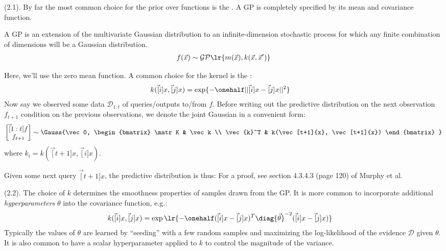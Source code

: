 \documentclass[11pt]{article}
\begin{document}
 (2.1). By far the most common choice for the prior over functions is the . A GP is completely specified by its mean and covariance function.
\begin{myquote}
	A GP is an extension of the multivariate Gaussian distribution to an infinite-dimension stochastic process for which any finite combination of dimensions will be a Gaussian distribution.
	\begin{align}
		f(\vec x) \sim \mathcal{GP}\lr{
			m(\vec x), k(\vec x, \vec x')	
	}
	\end{align}
\end{myquote}
Here, we'll use the zero mean function. A common choice for the kernel is the :
\begin{align}
	k(\vec[i]{x}, \vec[j]{x})
		&= \exp \{  -\onehalf || \vec[i]{x} - \vec[j]{x} ||^2 \}
\end{align}
Now say we observed some data $\mathcal{D}_{1:t}$ of queries/outputs to/from $f$. Before writing out the predictive distribution on the next observation $f_{t+1}$ condition on the previous observations, we denote the joint Gaussian in a convenient form:
\begin{align}
	\begin{bmatrix}
		\vec[1:t]{f} \\
		f_{t+1}
	\end{bmatrix}
	\sim 
	\Gauss{\vec 0,   
		\begin{bmatrix}
			\matr K & \vec k \\
			\vec{k}^T & k(\vec[t+1]{x}, \vec[t+1]{x}) 
		\end{bmatrix}
	}
\end{align}
where $k_i = k(\vec[t+1]{x}, \vec[i]{x})$.  

Given some next query $\vec[t+1]{x}$, the predictive distribution is thus:
For a proof, see section 4.3.4.3 (page 120) of Murphy et al.

 (2.2). The choice of $k$ determines the smoothness properties of samples drawn from the GP. It is more common to incorporate additional \textit{hyperparameters} $\theta$ into the covariance function, e.g.:
\begin{align}
	k(\vec[i]{x}, \vec[j]{x})
		&= \exp \lr {
			- \onehalf (\vec[i]{x} - \vec[j]{x})^T \diag{ \vec \theta}^{-2} (\vec[i]{x} - \vec[j]{x})
		}
\end{align}
Typically the values of $\theta$ are learned by ``seeding'' with a few random samples and maximizing the log-likelihood of the evidence $\mathcal D$ given $\theta$. It is also common to have a scalar hyperparameter applied to $k$ to control the magnitude of the variance.
\end{document}
